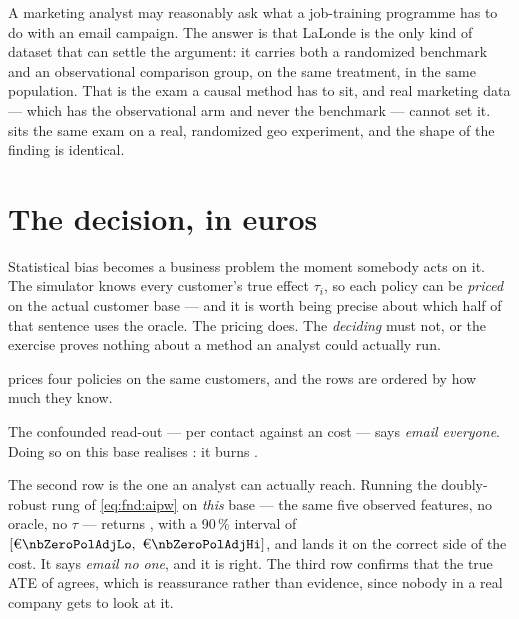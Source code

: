 \begin{remark}
A marketing analyst may reasonably ask what a job-training programme has to do with an email
campaign. The answer is that LaLonde is the only kind of dataset that can settle the argument: it
carries both a randomized benchmark and an observational comparison group, on the same treatment,
in the same population. That is the exam a causal method has to sit, and real marketing data ---
which has the observational arm and never the benchmark --- cannot set it.  sits the
same exam on a real, randomized geo experiment, and the shape of the finding is identical.
\end{remark}

\section{The decision, in euros}
\label{sec:fnd:euro}

Statistical bias becomes a business problem the moment somebody acts on it. The simulator knows
every customer's true effect $\tau_i$, so each policy can be \emph{priced} on the actual customer
base --- and it is worth being precise about which half of that sentence uses the oracle. The
pricing does. The \emph{deciding} must not, or the exercise proves nothing about a method an
analyst could actually run.



 prices four policies on the same \nbZeroNCustomers{} customers, and the
rows are ordered by how much they know.

The confounded read-out --- \eur{\nbZeroNaiveObs} per contact against an \eur{\nbZeroCost} cost
--- says \emph{email everyone}. Doing so on this base realises \eur{\nbZeroPolEveryone}: it burns
\eur{\nbZeroPolBurn}.

The second row is the one an analyst can actually reach. Running the doubly-robust rung of
\cref{eq:fnd:aipw} on \emph{this} base --- the same five observed features, no oracle, no $\tau$
--- returns \eur{\nbZeroPolAdjEst}, with a 90\,\% interval of
$[\eur{\nbZeroPolAdjLo},\ \eur{\nbZeroPolAdjHi}]$, and lands it on the correct side of the cost.
It says \emph{email no one}, and it is right. The third row confirms that the true ATE of
\eur{\nbZeroAte} agrees, which is reassurance rather than evidence, since nobody in a real
company gets to look at it.

